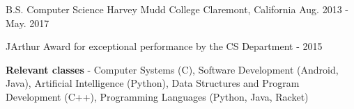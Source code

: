 

\begin{cventries}

  \cventry
    {B.S. Computer Science} %
    {Harvey Mudd College} %
    {Claremont, California} %
    {Aug. 2013 - May. 2017} %
    {
      \begin{cvitems} %
        \item {
          JArthur Award for exceptional performance by the CS Department - 2015
        }
        \item {
          \textbf{Relevant classes} - 
          Computer Systems (C), Software Development (Android, Java), Artificial
          Intelligence (Python), Data Structures and Program Development (C++),
          Programming Languages (Python, Java, Racket)
        }
      \end{cvitems}
    }

\end{cventries}
